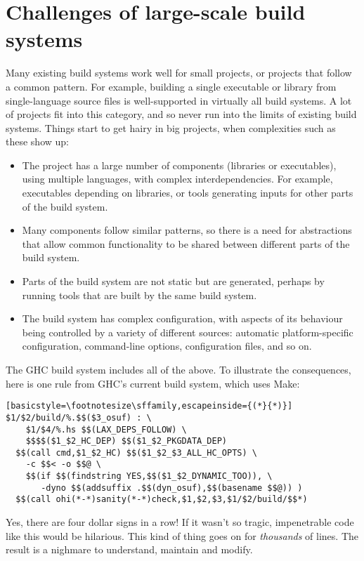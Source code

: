 \section{Challenges of large-scale build systems\label{sec:challenges}}

Many existing build systems work well for small projects, or
projects that follow a common pattern.  For example, building a single
executable or library from single-language source files is well-supported in
virtually all build systems. A lot of projects fit into this category, and so
never run into the limits of existing build systems. Things start to get hairy
in big projects, when complexities such as these show up:
\begin{itemize}
\item The project has a large number of components (libraries or
  executables), using multiple languages, with complex
  interdependencies.  For example, executables depending on libraries,
  or tools generating inputs for other parts of the build system.
\item Many components follow similar patterns, so there is a need for
  abstractions that allow common functionality to be shared between
  different parts of the build system.
\item Parts of the build system are not static but are generated,
  perhaps by running tools that are built by the same build system.
\item The build system has complex configuration, with aspects of its
  behaviour being controlled by a variety of different sources:
  automatic platform-specific configuration, command-line options,
  configuration files, and so on.
\end{itemize}
The GHC build system includes all of the above. To illustrate the
consequences, here is one rule from GHC's current build system, which
uses Make:
\begin{lstlisting}[basicstyle=\footnotesize\sffamily,escapeinside={(*}{*)}]
$1/$2/build/%.$$($3_osuf) : \
    $1/$4/%.hs $$(LAX_DEPS_FOLLOW) \
    $$$$($1_$2_HC_DEP) $$($1_$2_PKGDATA_DEP)
  $$(call cmd,$1_$2_HC) $$($1_$2_$3_ALL_HC_OPTS) \
    -c $$< -o $$@ \
    $$(if $$(findstring YES,$$($1_$2_DYNAMIC_TOO)), \
       -dyno $$(addsuffix .$$(dyn_osuf),$$(basename $$@)) )
  $$(call ohi(*-*)sanity(*-*)check,$1,$2,$3,$1/$2/build/$$*)
\end{lstlisting}
Yes, there are four dollar signs in a row!  If it wasn't so tragic,
impenetrable code like this would be hilarious.  This kind of thing
goes on for \emph{thousands} of lines.  The result is a nighmare to
understand, maintain and modify.


